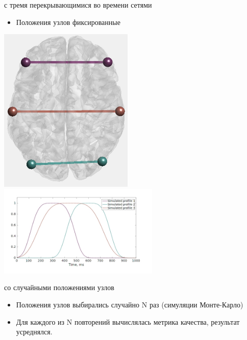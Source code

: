 \documentclass[12pt]{beamer}
\begin{document}
\begin{frame}[t]
\begin{columns}
\begin{column}{0.6\textwidth}
        \end{column}
        \begin{column}{0.4\textwidth}
            \begin{block}{ с тремя перекрывающимися во времени сетями}
                \begin{itemize}
                    \tiny
                    \item Положения узлов фиксированные
                \end{itemize}
            \centering
            \includegraphics[angle=90, width=0.5\textwidth]{../images/psiicos_paper/Figure2a_hr.jpg}
            \includegraphics[width=0.6\textwidth]{../images/psiicos_paper/Figure2b_hr.jpg}
            \end{block}
            \begin{block}{ со случайными положениями узлов}
                \begin{itemize}
                    \tiny
                    \item Положения узлов выбирались случайно N раз (симуляции Монте-Карло)
                    \item Для каждого из N повторений вычислялась метрика качества, результат усреднялся.
                \end{itemize}
            \end{block}
        \end{column}
    \end{columns}
\end{frame}
\end{document}
